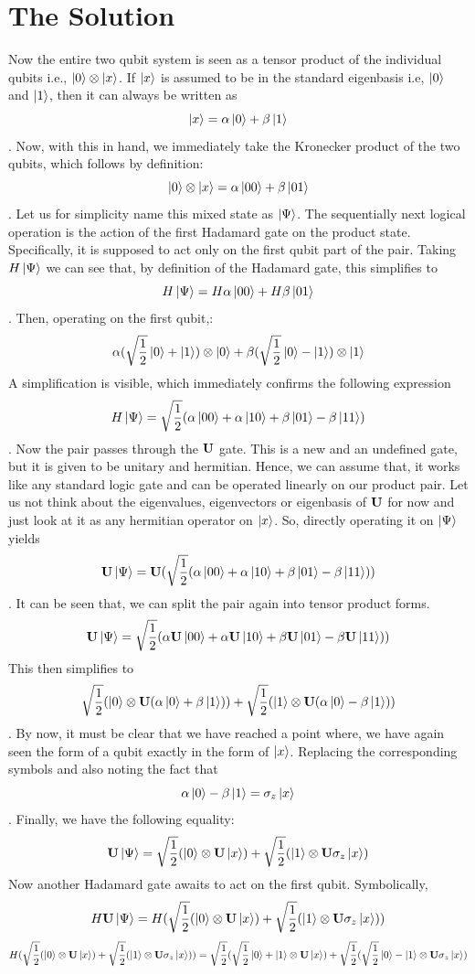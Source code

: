 \section{The Solution}
Now the entire two qubit system is seen as a tensor product of the individual qubits i.e., $\left| 0 \right> \otimes \left| x \right>$. If $\left| x \right>$ is assumed to be in the standard eigenbasis i.e, $\left| 0 \right>$ and $\left| 1 \right>$, then it can always be written as $$\left| x \right> = \alpha\left| 0 \right> + \beta\left| 1 \right>$$. Now, with this in hand, we immediately take the Kronecker product of the two qubits, which follows by definition: $$\left| 0 \right> \otimes \left| x \right> = \alpha\left| 00 \right> + \beta\left| 01 \right>$$. Let us for simplicity name this mixed state as $\left| \Psi \right>$. The sequentially next logical operation is the action of the first Hadamard gate on the product state. Specifically, it is supposed to act only on the first qubit part of the pair. Taking $H\left| \Psi \right>$ we can see that, by definition of the Hadamard gate, this simplifies to $$H\left| \Psi \right> = H\alpha\left| 00 \right> +H \beta\left| 01 \right>$$. Then, operating on the first qubit,: $$\alpha(\sqrt{\frac{1}{2}}\left| 0 \right>+\left| 1 \right>) \otimes \left| 0 \right> + \beta(\sqrt{\frac{1}{2}}\left| 0 \right>-\left| 1 \right>) \otimes \left| 1 \right>$$
 A simplification is visible, which immediately confirms the following expression $$H\left| \Psi \right> = \sqrt{\frac{1}{2}}(\alpha\left| 00 \right>+\alpha\left| 10 \right> + \beta\left| 01 \right> - \beta\left| 11 \right>)$$. Now the pair passes through the $\mathbf{U}$ gate. This is a new and an undefined gate, but it is given to be unitary and hermitian. Hence, we can assume that, it works like any standard logic gate and can be operated linearly on our product pair. Let us not think about the eigenvalues, eigenvectors or eigenbasis of $\mathbf{U}$ for now and just look at it as any hermitian operator on $\left| x \right>$. So, directly operating it on $\left| \Psi \right>$ yields $$ \mathbf{U}\left| \Psi \right> = \mathbf{U}( \sqrt{\frac{1}{2}}(\alpha\left| 00 \right>+\alpha\left| 10 \right> + \beta\left| 01 \right> - \beta\left| 11 \right>))$$. It can be seen that, we can split the pair again into tensor product forms.  $$ \mathbf{U}\left| \Psi \right> =  \sqrt{\frac{1}{2}}(\alpha\mathbf{U}\left| 00 \right>+\alpha\mathbf{U}\left| 10 \right> + \beta\mathbf{U}\left| 01 \right> - \beta\mathbf{U}\left| 11 \right>))$$
This then simplifies to $$\sqrt{\frac{1}{2}}(\left| 0 \right> \otimes \mathbf{U}(\alpha\left| 0 \right> + \beta\left| 1 \right>)) + \sqrt{\frac{1}{2}}(\left| 1 \right> \otimes \mathbf{U}(\alpha\left| 0 \right> - \beta\left| 1 \right>))$$. By now, it must be clear that we have reached a point where, we have again seen the form of a qubit exactly in the form of $\left| x \right>$. Replacing the corresponding symbols and also noting the fact that $$\alpha\left| 0 \right> - \beta\left| 1 \right> = \sigma_{z}\left| x \right>$$. Finally, we have the following equality:
$$ \mathbf{U}\left| \Psi \right> = \sqrt{\frac{1}{2}}(\left| 0 \right> \otimes \mathbf{U}\left| x \right>) + \sqrt{\frac{1}{2}}(\left| 1 \right> \otimes \mathbf{U}\sigma_{z}\left| x \right>)$$
Now another Hadamard gate awaits to act on the first qubit. Symbolically, $$H \mathbf{U}\left| \Psi \right> = H(\sqrt{\frac{1}{2}}(\left| 0 \right> \otimes \mathbf{U}\left| x \right>) + \sqrt{\frac{1}{2}}(\left| 1 \right> \otimes \mathbf{U}\sigma_{z}\left| x \right>))$$
$$H(\sqrt{\frac{1}{2}}(\left| 0 \right> \otimes \mathbf{U}\left| x \right>) + \sqrt{\frac{1}{2}}(\left| 1 \right> \otimes \mathbf{U}\sigma_{z}\left| x \right>)) = \sqrt{\frac{1}{2}}(\sqrt{\frac{1}{2}}\left| 0 \right>+\left| 1 \right> \otimes \mathbf{U}\left| x \right>) + \sqrt{\frac{1}{2}}(\sqrt{\frac{1}{2}}\left| 0 \right>-\left| 1 \right> \otimes \mathbf{U}\sigma_{z}\left| x \right>)$$

